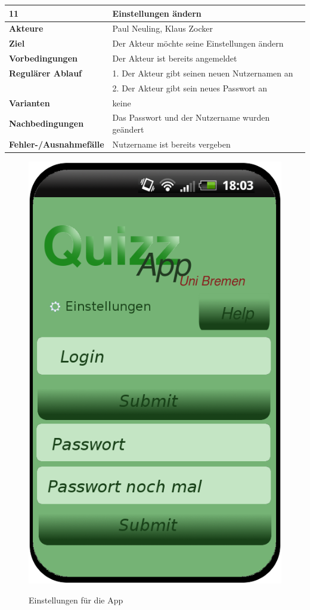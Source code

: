 \documentclass[fontsize=12pt,paper=a4,twoside]{scrartcl}
\begin{document}
\begin{table}
	[H] \label{11} 
	\begin{tabular}
		{|l|p{10cm}|} \hline \textbf{11} & \textbf{Einstellungen ändern} \\
		\hline \textbf{Akteure} & Paul Neuling, Klaus Zocker\\
		\hline \textbf{Ziel} & Der Akteur möchte seine Einstellungen ändern\\
		\hline \textbf{Vorbedingungen} & Der Akteur ist bereits angemeldet\\
		\hline \textbf{Regulärer Ablauf} & 1. Der Akteur gibt seinen neuen Nutzernamen an\\
		&2. Der Akteur gibt sein neues Passwort an\\
		\hline \textbf{Varianten} & keine \\
		\hline \textbf{Nachbedingungen} & Das Passwort und der Nutzername wurden geändert\\
		\hline \textbf{Fehler-/Ausnahmefälle} & Nutzername ist bereits vergeben \\
		\hline 
	\end{tabular}
\end{table}

\begin{figure}
	[H] \caption{Einstellungen für die App} 
	\includegraphics[width=0.5
	\textwidth]{Bilder/QuizzEinstellungen.png} \label{pic:Startseite} 
\end{figure}
\end{document}
